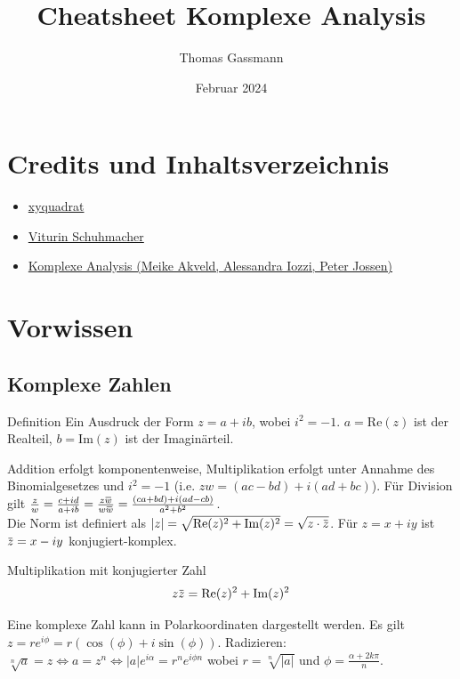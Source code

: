 \documentclass[a4paper,10pt]{article}
\title{Cheatsheet Komplexe Analysis}
\author{Thomas Gassmann}
\date{Februar 2024}
\def\Re{\text{Re}}
\def\Im{\text{Im}}
\newcommand{\overbar}[1]{\mkern 1.5mu\overline{\mkern-1.5mu#1\mkern-1.5mu}\mkern 1.5mu}
\begin{document}


\section{Credits und Inhaltsverzeichnis}

\begin{itemize}
    \item \href{https://github.com/XYQuadrat/eth-cheatsheets}{xyquadrat}
    \item \href{https://amiv.ethz.ch/en/studies/documents/63f48ab8236e8866a0e84f51}{Viturin Schuhmacher}
    \item \href{https://people.math.ethz.ch/~iozzi/SkriptKomplexeAnalysis.pdf}{Komplexe Analysis (Meike Akveld, Alessandra Iozzi, Peter Jossen)}
\end{itemize}


\tableofcontents

\section{Vorwissen}
\subsection{Komplexe Zahlen}
\begin{mainbox}{Definition}
Ein Ausdruck der Form $z = a + ib$, wobei $i^2 = -1$. $a = \Re(z)$ ist der Realteil, $b = \Im(z)$ ist der Imaginärteil.
\end{mainbox}

Addition erfolgt komponentenweise, Multiplikation erfolgt unter Annahme des Binomialgesetzes und $i^2 = -1$ (i.e. $z w = (a c - b d) + i (a d + b  c)$). Für Division gilt $\frac{z}{w} = \frac{c + id}{a + ib} = \frac{z\overbar{w}}{w\overbar{w}} = \frac{(ca + bd) + i(ad - cb)}{a^2 + b^2}$.\\
Die Norm ist definiert als $|z| = \sqrt{\Re(z)^2 + \Im(z)^2} = \sqrt{z \cdot \overbar{z}}$. Für $z = x + iy$ ist $\overbar{z} = x - iy$ konjugiert-komplex.

\begin{subbox}{Multiplikation mit konjugierter Zahl}
$$z \overbar{z} = \Re(z)^2 + \Im(z)^2$$
\end{subbox}

Eine komplexe Zahl kann in Polarkoordinaten dargestellt werden. Es gilt $z = re^{i\phi} = r(\cos(\phi) + i\sin(\phi))$.
Radizieren: $\sqrt[n]{a} = z \iff a = z^n \iff |a| e^{i\alpha} = r^n e^{i\phi n}$ wobei $r = \sqrt[n]{|a|}$ und $\phi = \frac{\alpha + 2k\pi}{n}$.
\end{document}
